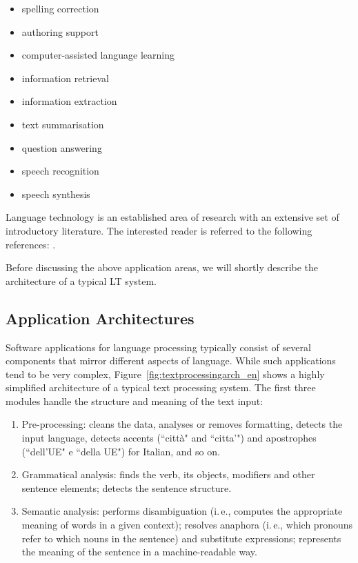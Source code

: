 \begin{multicols}{2}
\begin{itemize}
\item spelling correction
\item authoring support
\item computer-assisted language learning
\item information retrieval 
\item information extraction
\item text summarisation
\item question answering
\item speech recognition 
\item speech synthesis 
\end{itemize}

Language technology is an established area of research with an extensive set
of introductory literature. The interested reader is referred to the following
references:  \cite{carstensen-etal1, jurafsky-martin01, manning-schuetze1,
  lt-world1, lt-survey1}.

Before discussing the above application areas, we will shortly describe the
architecture of a typical LT system.

\subsection{Application Architectures}

Software applications for language processing typically consist of several
components that mirror different aspects of language. While such applications
tend to be very complex, Figure~\ref{fig:textprocessingarch_en} shows a 
highly simplified architecture of a typical text processing system. The first 
three modules handle the structure and meaning of the text input:

\begin{enumerate}
\item Pre-processing: cleans the data, analyses or removes formatting, detects
  the input language, detects accents (“citt\`{a}" and “citta'") and apostrophes (“dell'UE" e “della UE") for Italian, and so on.
\item Grammatical analysis: finds the verb, its objects, modifiers and
  other sentence elements; detects the sentence structure.
\item Semantic analysis: performs disambiguation (i.\,e., computes the appropriate meaning of words in a given context); resolves anaphora (i.\,e., which pronouns refer to which nouns in the sentence) and substitute expressions; represents the meaning of the sentence in a machine-readable way.
\end{enumerate}


\end{multicols}
